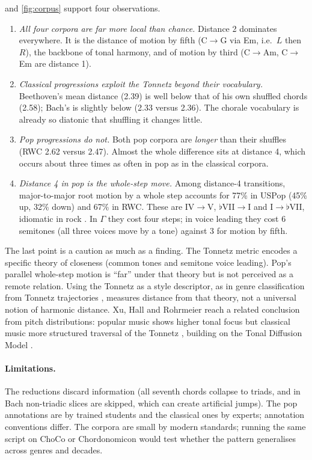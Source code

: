  and \cref{fig:corpus} support four observations.
\begin{enumerate}
\item \emph{All four corpora are far more local than chance.} Distance 2 dominates everywhere. It is the distance
of motion by fifth (C$\to$G via Em, i.e.\ $L$ then $R$), the backbone of tonal harmony, and of motion by third
(C$\to$Am, C$\to$Em are distance 1).
\item \emph{Classical progressions exploit the Tonnetz beyond their vocabulary.} Beethoven's mean distance (2.39) is
well below that of his own shuffled chords (2.58); Bach's is slightly below (2.33 versus 2.36). The chorale
vocabulary is already so diatonic that shuffling it changes little.
\item \emph{Pop progressions do not.} Both pop corpora are \emph{longer} than their shuffles (RWC 2.62 versus
2.47). Almost the whole difference sits at distance 4, which occurs about three times as often in pop as in the
classical corpora.
\item \emph{Distance 4 in pop is the whole-step move.} Among distance-4 transitions, major-to-major root motion by
a whole step accounts for 77\% in USPop (45\% up, 32\% down) and 67\% in RWC. These are IV$\to$V, $\flat$VII$\to$I and
I$\to\flat$VII, idiomatic in rock \citep{biamonte2010,declercq2011}. In $\Gamma$ they cost four steps; in voice
leading they cost 6 semitones (all three voices move by a tone) against 3 for motion by fifth.
\end{enumerate}
The last point is a caution as much as a finding. The Tonnetz metric encodes a specific theory of closeness
(common tones and semitone voice leading). Pop's parallel whole-step motion is ``far'' under that theory but is not
perceived as a remote relation. Using the Tonnetz as a style descriptor, as in genre classification from Tonnetz
trajectories \citep{karystinaios2020}, measures distance from that theory, not a universal notion of harmonic
distance. Xu, Hall and Rohrmeier reach a related conclusion from pitch distributions: popular music shows higher
tonal focus but classical music more structured traversal of the Tonnetz \citep{xu2026}, building on the Tonal
Diffusion Model \citep{lieck2020}.

\paragraph{Limitations.} The reductions discard information (all seventh chords collapse to triads, and in Bach
non-triadic slices are skipped, which can create artificial jumps). The pop annotations are by trained students and
the classical ones by experts; annotation conventions differ. The corpora are small by modern standards; running
the same script on ChoCo or Chordonomicon would test whether the pattern generalises across genres and decades.

